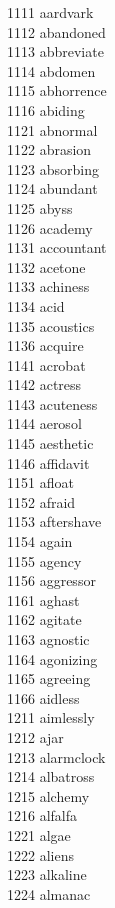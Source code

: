 1111 aardvark \\
1112 abandoned \\
1113 abbreviate \\
1114 abdomen \\
1115 abhorrence \\
1116 abiding \\
1121 abnormal \\
1122 abrasion \\
1123 absorbing \\
1124 abundant \\
1125 abyss \\
1126 academy \\
1131 accountant \\
1132 acetone \\
1133 achiness \\
1134 acid \\
1135 acoustics \\
1136 acquire \\
1141 acrobat \\
1142 actress \\
1143 acuteness \\
1144 aerosol \\
1145 aesthetic \\
1146 affidavit \\
1151 afloat \\
1152 afraid \\
1153 aftershave \\
1154 again \\
1155 agency \\
1156 aggressor \\
1161 aghast \\
1162 agitate \\
1163 agnostic \\
1164 agonizing \\
1165 agreeing \\
1166 aidless \\
1211 aimlessly \\
1212 ajar \\
1213 alarmclock \\
1214 albatross \\
1215 alchemy \\
1216 alfalfa \\
1221 algae \\
1222 aliens \\
1223 alkaline \\
1224 almanac \\
